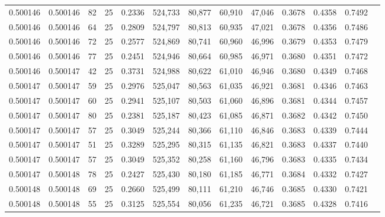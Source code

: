 \begin{tabular}{rrrrrrrrrrrrr}
0.500146 & 0.500146 &    82 &  25 &                                     0.2336 & 524,733 &  80,877 &  60,910 &  47,046 & 0.3678 & 0.4358 & 0.7492 \\
0.500146 & 0.500146 &    64 &  25 &                                     0.2809 & 524,797 &  80,813 &  60,935 &  47,021 & 0.3678 & 0.4356 & 0.7486 \\
0.500146 & 0.500146 &    72 &  25 &                                     0.2577 & 524,869 &  80,741 &  60,960 &  46,996 & 0.3679 & 0.4353 & 0.7479 \\
0.500146 & 0.500146 &    77 &  25 &                                     0.2451 & 524,946 &  80,664 &  60,985 &  46,971 & 0.3680 & 0.4351 & 0.7472 \\
0.500146 & 0.500147 &    42 &  25 &                                     0.3731 & 524,988 &  80,622 &  61,010 &  46,946 & 0.3680 & 0.4349 & 0.7468 \\
0.500147 & 0.500147 &    59 &  25 &                                     0.2976 & 525,047 &  80,563 &  61,035 &  46,921 & 0.3681 & 0.4346 & 0.7463 \\
0.500147 & 0.500147 &    60 &  25 &                                     0.2941 & 525,107 &  80,503 &  61,060 &  46,896 & 0.3681 & 0.4344 & 0.7457 \\
0.500147 & 0.500147 &    80 &  25 &                                     0.2381 & 525,187 &  80,423 &  61,085 &  46,871 & 0.3682 & 0.4342 & 0.7450 \\
0.500147 & 0.500147 &    57 &  25 &                                     0.3049 & 525,244 &  80,366 &  61,110 &  46,846 & 0.3683 & 0.4339 & 0.7444 \\
0.500147 & 0.500147 &    51 &  25 &                                     0.3289 & 525,295 &  80,315 &  61,135 &  46,821 & 0.3683 & 0.4337 & 0.7440 \\
0.500147 & 0.500147 &    57 &  25 &                                     0.3049 & 525,352 &  80,258 &  61,160 &  46,796 & 0.3683 & 0.4335 & 0.7434 \\
0.500147 & 0.500148 &    78 &  25 &                                     0.2427 & 525,430 &  80,180 &  61,185 &  46,771 & 0.3684 & 0.4332 & 0.7427 \\
0.500148 & 0.500148 &    69 &  25 &                                     0.2660 & 525,499 &  80,111 &  61,210 &  46,746 & 0.3685 & 0.4330 & 0.7421 \\
0.500148 & 0.500148 &    55 &  25 &                                     0.3125 & 525,554 &  80,056 &  61,235 &  46,721 & 0.3685 & 0.4328 & 0.7416 \\

\end{tabular}
